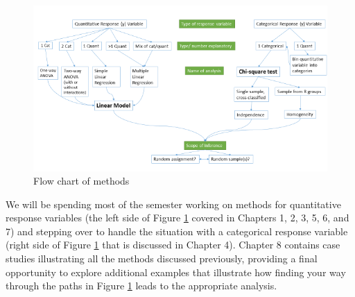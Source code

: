 \documentclass[]{article}
\begin{document}
\begin{figure}
\includegraphics[width=8.89in]{chapter0_files/image001} \caption{Flow chart of methods}\label{fig:Figure1}
\end{figure}

We will be spending most of the semester working on methods for
quantitative response variables (the left side of Figure
\ref{fig:Figure1} covered in Chapters 1, 2, 3, 5, 6, and 7) and stepping
over to handle the situation with a categorical response variable (right
side of Figure \ref{fig:Figure1} that is discussed in Chapter 4).
Chapter 8 contains case studies illustrating all the methods discussed
previously, providing a final opportunity to explore additional examples
that illustrate how finding your way through the paths in Figure
\ref{fig:Figure1} leads to the appropriate analysis.
\end{document}
